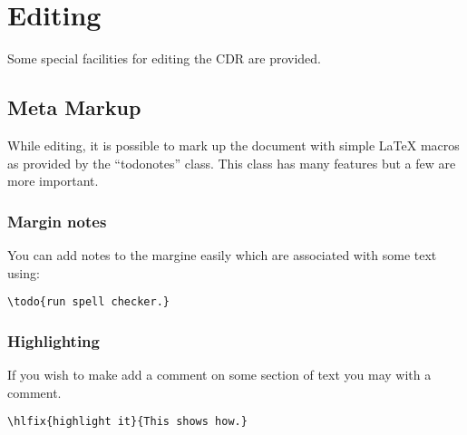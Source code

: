 \chapter{Editing}

Some special facilities for editing the CDR are provided.


\section{Meta Markup}

While editing, it is possible to mark up the document with simple
\LaTeX{} macros as provided by the ``todonotes'' class.
This class has many features but a few are more important.



\subsection{Margin notes}

You can add notes to the margine easily which
are associated with some text using:

\begin{verbatim}
\todo{run spell checker.}
\end{verbatim}

\subsection{Highlighting}

If you wish to make add a comment on some section of text you may
with a comment.


\begin{verbatim}
\hlfix{highlight it}{This shows how.}
\end{verbatim}


